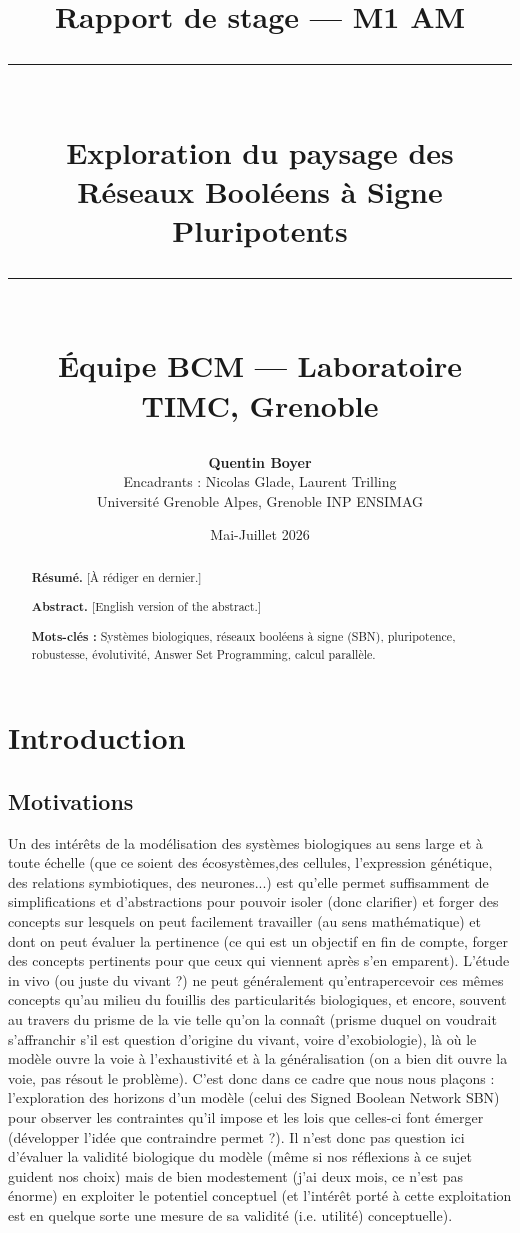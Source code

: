 \documentclass[12pt, a4paper]{article}
\title{
    \vspace{2cm}
    {\Large Rapport de stage --- M1 AM}\\[0.5cm]
    \rule{\linewidth}{0.4pt}\\[0.4cm]
    {\LARGE \textbf{Exploration du paysage des\\
    Réseaux Booléens à Signe Pluripotents}}\\[0.4cm]
    \rule{\linewidth}{0.4pt}\\[1cm]
    {\large Équipe BCM --- Laboratoire TIMC, Grenoble}
}
\author{
    \textbf{Quentin Boyer}\\[0.3cm]
    \small Encadrants : Nicolas Glade, Laurent Trilling\\
    \small Université Grenoble Alpes, Grenoble INP ENSIMAG
}
\date{\small Mai-Juillet 2026}
\begin{document}

\maketitle
\thispagestyle{empty}
\newpage

\begin{abstract}
\noindent
\textbf{Résumé.}
[À rédiger en dernier.]

\bigskip
\noindent
\textbf{Abstract.}
[English version of the abstract.]

\bigskip
\noindent
\textbf{Mots-clés :} Systèmes biologiques, réseaux booléens à signe (SBN), pluripotence, robustesse, évolutivité,
Answer Set Programming, calcul parallèle.
\end{abstract}

\newpage
\tableofcontents
\newpage

\section{Introduction}

\subsection{Motivations}

Un des intérêts de la modélisation des systèmes biologiques au sens large et à toute échelle (que ce soient des écosystèmes,des cellules, l'expression génétique, des relations symbiotiques, des neurones...) est qu'elle permet suffisamment de simplifications et d'abstractions pour pouvoir isoler (donc clarifier) et forger des concepts sur lesquels on peut facilement travailler (au sens mathématique) et dont on peut évaluer la pertinence (ce qui est un objectif en fin de compte, forger des concepts pertinents pour que ceux qui viennent après s'en emparent). L'étude in vivo (ou juste du vivant ?) ne peut généralement qu'entrapercevoir ces mêmes concepts qu'au milieu du fouillis des particularités biologiques, et encore, souvent au travers du prisme de la vie telle qu'on la connaît (prisme duquel on voudrait s'affranchir s'il est question d'origine du vivant, voire d'exobiologie), là où le modèle ouvre la voie à l'exhaustivité et à la généralisation (on a bien dit ouvre la voie, pas résout le problème). C'est donc dans ce cadre que nous nous plaçons : l'exploration des horizons d'un modèle (celui des Signed Boolean Network SBN) pour observer les contraintes qu'il impose et les lois que celles-ci font émerger (développer l'idée que contraindre permet ?). Il n'est donc pas question ici d'évaluer la validité biologique du modèle (même si nos réflexions à ce sujet guident nos choix) mais de bien modestement (j'ai deux mois, ce n'est pas énorme) en exploiter le potentiel conceptuel (et l'intérêt porté à cette exploitation est en quelque sorte une mesure de sa validité (i.e. utilité) conceptuelle).
\end{document}
